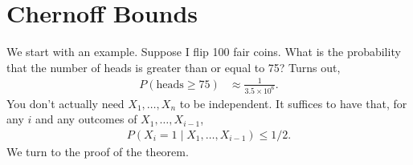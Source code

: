 \documentclass{report}
\begin{document}
\chapter{Chernoff Bounds}
We start with an example. Suppose I flip 100 fair coins. What is the probability that the number of heads is greater than or equal to 75? Turns out,
\begin{align*}
    P(\text{heads} \geq 75) &\approx \frac{1}{3.5 \times 10^6}.
\end{align*}
\noindent You don't actually need $X_1, \ldots, X_n$ to be independent. It suffices to have that, for any $i$ and any outcomes of $X_1, \ldots, X_{i-1}$,
\begin{align*}
    P(X_i = 1 \mid X_1, \ldots, X_{i-1}) \leq 1/2.
\end{align*}
\noindent We turn to the proof of the theorem.
\end{document}
